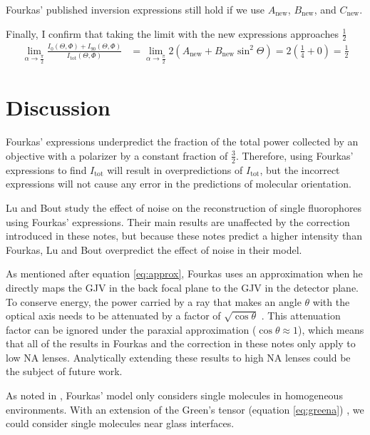 \documentclass[11pt]{article}
\begin{document}
Fourkas' published inversion expressions still hold if we use $A_{\text{new}}$,
$B_{\text{new}}$, and $C_{\text{new}}$.

Finally, I confirm that taking the limit with the new expressions approaches $\frac{1}{2}$
\begin{align}
  \lim_{\alpha\rightarrow \frac{\pi}{2}} \frac{I_{0}(\Theta, \Phi) + I_{90}(\Theta, \Phi)}{I_{\text{tot}}(\Theta, \Phi)} &= \lim_{\alpha\rightarrow \frac{\pi}{2}} 2\left(A_{\text{new}} + B_{\text{new}}\sin^2\Theta\right) =2\left(\frac{1}{4} + 0\right) = \frac{1}{2}  
\end{align}

\section{Discussion} \label{discussion} Fourkas' expressions underpredict the
fraction of the total power collected by an objective with a polarizer by a
constant fraction of $\frac{3}{2}$. Therefore, using Fourkas' expressions to
find $I_{\text{tot}}$ will result in overpredictions of $I_{\text{tot}}$, but
the incorrect expressions will not cause any error in the predictions of molecular
orientation.

Lu and Bout \cite{bout2008} study the effect of noise on the reconstruction of
single fluorophores using Fourkas' expressions. Their main results are
unaffected by the correction introduced in these notes, but because these notes
predict a higher intensity than Fourkas, Lu and Bout overpredict the effect of
noise in their model.

As mentioned after equation \ref{eq:approx}, Fourkas uses an approximation when
he directly maps the GJV in the back focal plane to the GJV in the detector
plane. To conserve energy, the power carried by a ray that makes an angle
$\theta$ with the optical axis needs to be attenuated by a factor of
$\sqrt{\cos\theta}$ \cite{nov, backer}. This attenuation factor can be ignored
under the paraxial approximation ($\cos\theta \approx 1$), which means that all
of the results in Fourkas and the correction in these notes only apply to low NA
lenses. Analytically extending these results to high NA lenses could be the
subject of future work.

As noted in \cite{lieb}, Fourkas' model only considers single molecules in
homogeneous environments. With an extension of the Green's tensor (equation
\ref{eq:greena}) \cite{nov, backer}, we could consider single molecules near
glass interfaces.

{}

\end{document}

